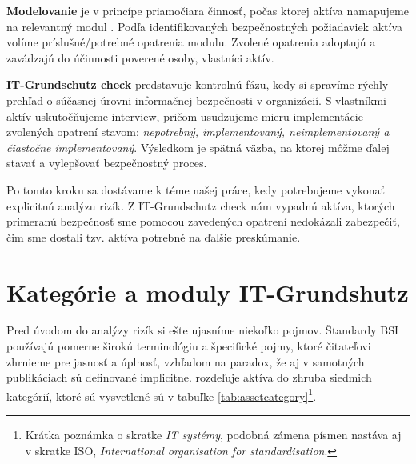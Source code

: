 \textbf{Modelovanie} je v princípe priamočiara činnosť, počas ktorej aktíva namapujeme na relevantný modul \cite{GSK}. Podľa identifikovaných bezpečnostných
požiadaviek aktíva volíme príslušné/potrebné opatrenia modulu. Zvolené opatrenia adoptujú a zavádzajú do účinnosti poverené osoby, vlastníci aktív.

\textbf{IT-Grundschutz check} predstavuje kontrolnú fázu, kedy si spravíme rýchly prehľad o súčasnej úrovni informačnej bezpečnosti v organizácií. S vlastníkmi
aktív uskutočňujeme interview, pričom usudzujeme mieru implementácie zvolených opatrení stavom: \emph{nepotrebný, implementovaný, neimplementovaný a čiastočne
implementovaný}. Výsledkom je spätná väzba, na ktorej môžme ďalej stavať a vylepšovať bezpečnostný proces.

Po tomto kroku sa dostávame k téme našej práce, kedy potrebujeme vykonať explicitnú analýzu rizík. Z IT-Grundschutz check nám vypadnú aktíva, ktorých
primeranú bezpečnosť sme pomocou zavedených opatrení nedokázali zabezpečiť, čim sme dostali tzv. aktíva potrebné na ďalšie preskúmanie.


\section{Kategórie a moduly IT-Grundshutz}

Pred úvodom do analýzy rizík si ešte ujasníme niekoľko pojmov. Štandardy BSI používajú pomerne širokú terminológiu a špecifické pojmy, ktoré čitateľovi
zhrnieme pre jasnosť a úplnosť, vzhľadom na paradox, že aj v samotných publikáciach sú definované implicitne. \cite{GSK} rozdeľuje aktíva do zhruba siedmich
kategórií, ktoré sú vysvetlené sú v tabuľke \ref{tab:assetcategory}\footnote{Krátka poznámka o skratke \emph{IT systémy}, podobná zámena písmen nastáva aj
v skratke ISO, \emph{International organisation for standardisation}.}.


